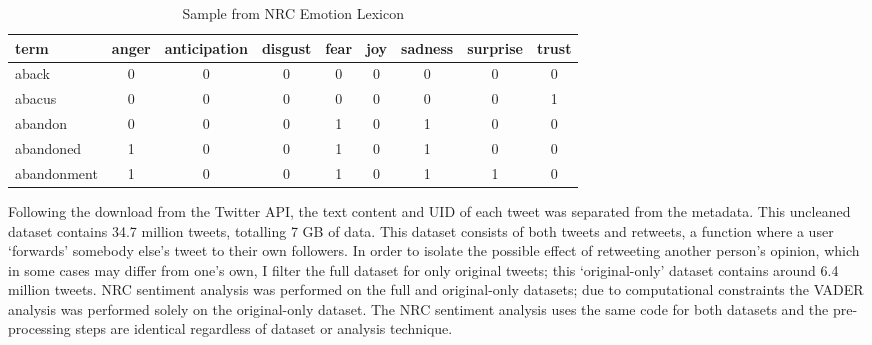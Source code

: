 \documentclass{article}
\begin{document}
\begin{singlespace}
  \begin{table}[!htb]\centering \caption{Sample from NRC Emotion Lexicon \parencite{mohammadCrowdsourcingWordEmotion2013}}
    \begin{tabular}{@{}lcccccccc@{}}
    \toprule
    term        & anger & anticipation & disgust & fear & joy & sadness & surprise & trust \\ \midrule
    aback       & 0     & 0            & 0       & 0    & 0   & 0       & 0        & 0     \\
    abacus      & 0     & 0            & 0       & 0    & 0   & 0       & 0        & 1     \\
    abandon     & 0     & 0            & 0       & 1    & 0   & 1       & 0        & 0     \\
    abandoned   & 1     & 0            & 0       & 1    & 0   & 1       & 0        & 0     \\
    abandonment & 1     & 0            & 0       & 1    & 0   & 1       & 1        & 0     \\ \bottomrule
    \end{tabular}
    \end{table}
\end{singlespace}

Following the download from the Twitter API, the text content and UID of each tweet was separated from the metadata. This uncleaned dataset contains 34.7 million tweets, totalling 7 GB of data. This dataset consists of both tweets and retweets, a function where a user `forwards' somebody else's tweet to their own followers. In order to isolate the possible effect of retweeting another person's opinion, which in some cases may differ from one's own, I filter the full dataset for only original tweets; this `original-only' dataset contains around 6.4 million tweets. NRC sentiment analysis was performed on the full and original-only datasets; due to computational constraints the VADER analysis was performed solely on the original-only dataset. The NRC sentiment analysis uses the same code for both datasets and the pre-processing steps are identical regardless of dataset or analysis technique.
\end{document}

